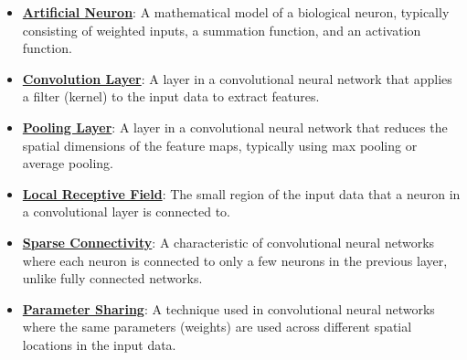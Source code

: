 \documentclass{article}%
\begin{document}
\begin{itemize}[leftmargin=*]
\item \href{https://purdue.brightspace.com/d2l/common/assets/pdfjs-d2l-dist/1.0.14-legacy/web/viewer.html?file=\%2Fcontent\%2Fenforced\%2F1095467-wl.202510.CS.24300.001\%2F09L1-cnn.pdf\%3Fou\%3D1095467\&lang=en-us\&container=d2l-fileviewer-rendered-pdf\&fullscreen=d2l-fileviewer-rendered-pdf-dialog\&height=667#page=5}{\textbf{Artificial Neuron}}: A mathematical model of a biological neuron, typically consisting of weighted inputs, a summation function, and an activation function.%
\item \href{https://purdue.brightspace.com/d2l/common/assets/pdfjs-d2l-dist/1.0.14-legacy/web/viewer.html?file=\%2Fcontent\%2Fenforced\%2F1095467-wl.202510.CS.24300.001\%2F09L1-cnn.pdf\%3Fou\%3D1095467\&lang=en-us\&container=d2l-fileviewer-rendered-pdf\&fullscreen=d2l-fileviewer-rendered-pdf-dialog\&height=667#page=6}{\textbf{Convolution Layer}}: A layer in a convolutional neural network that applies a filter (kernel) to the input data to extract features.%
\item \href{https://purdue.brightspace.com/d2l/common/assets/pdfjs-d2l-dist/1.0.14-legacy/web/viewer.html?file=\%2Fcontent\%2Fenforced\%2F1095467-wl.202510.CS.24300.001\%2F09L1-cnn.pdf\%3Fou\%3D1095467\&lang=en-us\&container=d2l-fileviewer-rendered-pdf\&fullscreen=d2l-fileviewer-rendered-pdf-dialog\&height=667#page=6}{\textbf{Pooling Layer}}: A layer in a convolutional neural network that reduces the spatial dimensions of the feature maps, typically using max pooling or average pooling.%
\item \href{https://purdue.brightspace.com/d2l/common/assets/pdfjs-d2l-dist/1.0.14-legacy/web/viewer.html?file=\%2Fcontent\%2Fenforced\%2F1095467-wl.202510.CS.24300.001\%2F09L1-cnn.pdf\%3Fou\%3D1095467\&lang=en-us\&container=d2l-fileviewer-rendered-pdf\&fullscreen=d2l-fileviewer-rendered-pdf-dialog\&height=667#page=10}{\textbf{Local Receptive Field}}: The small region of the input data that a neuron in a convolutional layer is connected to.%
\item \href{https://purdue.brightspace.com/d2l/common/assets/pdfjs-d2l-dist/1.0.14-legacy/web/viewer.html?file=\%2Fcontent\%2Fenforced\%2F1095467-wl.202510.CS.24300.001\%2F09L1-cnn.pdf\%3Fou\%3D1095467\&lang=en-us\&container=d2l-fileviewer-rendered-pdf\&fullscreen=d2l-fileviewer-rendered-pdf-dialog\&height=667#page=10}{\textbf{Sparse Connectivity}}: A characteristic of convolutional neural networks where each neuron is connected to only a few neurons in the previous layer, unlike fully connected networks.%
\item \href{https://purdue.brightspace.com/d2l/common/assets/pdfjs-d2l-dist/1.0.14-legacy/web/viewer.html?file=\%2Fcontent\%2Fenforced\%2F1095467-wl.202510.CS.24300.001\%2F09L1-cnn.pdf\%3Fou\%3D1095467\&lang=en-us\&container=d2l-fileviewer-rendered-pdf\&fullscreen=d2l-fileviewer-rendered-pdf-dialog\&height=667#page=12}{\textbf{Parameter Sharing}}: A technique used in convolutional neural networks where the same parameters (weights) are used across different spatial locations in the input data.%

\end{itemize}
\end{document}
